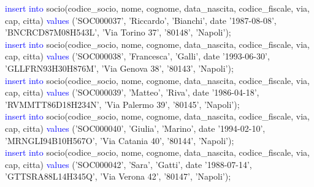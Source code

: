 \documentclass{article}
\begin{document}
\begin{flushleft}
{        \hspace*{0.5em}\textcolor{blue}{insert into} socio(codice\_socio, nome, cognome, data\_nascita, codice\_fiscale, via, \hspace*{0.5em}cap, citta) \textcolor{blue}{values} ('SOC000037', 'Riccardo', 'Bianchi', date '1987-08-08', \hspace*{0.4em}'BNCRCD87M08H543L', 'Via Torino 37', '80148', 'Napoli'); \\
        \vspace{2mm}
        \hspace*{0.5em}\textcolor{blue}{insert into} socio(codice\_socio, nome, cognome, data\_nascita, codice\_fiscale, via, \hspace*{0.5em}cap, citta) \textcolor{blue}{values} ('SOC000038', 'Francesca', 'Galli', date '1993-06-30', \hspace*{0.4em}'GLLFRN93H30H876M', 'Via Genova 38', '80143', 'Napoli'); \\
        \vspace{2mm}
        \hspace*{0.5em}\textcolor{blue}{insert into} socio(codice\_socio, nome, cognome, data\_nascita, codice\_fiscale, via, \hspace*{0.5em}cap, citta) \textcolor{blue}{values} ('SOC000039', 'Matteo', 'Riva', date '1986-04-18', \hspace*{0.4em}'RVMMTT86D18H234N', 'Via Palermo 39', '80145', 'Napoli'); \\
        \vspace{2mm}
        \hspace*{0.5em}\textcolor{blue}{insert into} socio(codice\_socio, nome, cognome, data\_nascita, codice\_fiscale, via, \hspace*{0.5em}cap, citta) \textcolor{blue}{values} ('SOC000040', 'Giulia', 'Marino', date '1994-02-10', \hspace*{0.4em}'MRNGLI94B10H567O', 'Via Catania 40', '80144', 'Napoli'); \\
        \vspace{2mm}
        \hspace*{0.5em}\textcolor{blue}{insert into} socio(codice\_socio, nome, cognome, data\_nascita, codice\_fiscale, via, \hspace*{0.5em}cap, citta) \textcolor{blue}{values} ('SOC000042', 'Sara', 'Gatti', date '1988-07-14', \hspace*{0.4em}'GTTSRA88L14H345Q', 'Via Verona 42', '80147', 'Napoli'); \\
        \vspace{2mm}
}
\end{flushleft}
\end{document}
